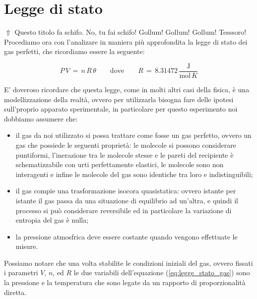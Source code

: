\section{Legge di stato}

$\Uparrow$ Questo titolo fa schifo. No, tu fai schifo! Gollum! Gollum! Gollum! Tesssoro!\\

Procediamo ora con l'analizare in maniera più approfondita la legge di stato dei gas perfetti, che ricordiamo essere la seguente:

\begin{equation*}
	P \, V \,=\, n \, R \, \theta \quad\quad \text{dove} \quad\quad R \,=\, 8.31472 \, \frac{\text{J}}{\text{mol} \, K}
\end{equation*}

E' doveroso ricordare che questa legge, come in molti altri casi della fisica, è una modellizzazione della realtà, ovvero per utilizzarla bisogna fare delle ipotesi sull'proprio apparato sperimentale, in particolare per questo esperimento noi dobbiamo assumere che:

\begin{itemize}
	\item{il gas da noi utilizzato si possa trattare come fosse un gas perfetto, ovvero un gas che possiede le seguenti proprietà: le molecole si possono considerare puntiformi, l'inerazione tra le molecole stesse e le pareti del recipiente è schematizzabile con urti perfettamente elastici, le molecole sono non interagenti e infine le molecole del gas sono identiche tra loro e indistinguibili;}
	\item{il gas compie una trasformazione isocora quasistatica: ovvero istante per istante il gas passa da una situazione di equilibrio ad un'altra, e quindi il processo si può considerare reversibile ed in particolare la variazione di entropia del gas è nulla;}
	\item{la pressione atmosfrica deve essere costante quando vengono effettuate le misure.}
\end{itemize}
%
Possiamo notare che una volta stabilite le condizioni iniziali del gas, ovvero fissati i parametri $V$, $n$, ed $R$ le due variabili dell'equazione (\ref{eq:legge_stato_gas}) sono la pressione e la temperatura che sono legate da un rapporto di proporzionalità diretta. 
